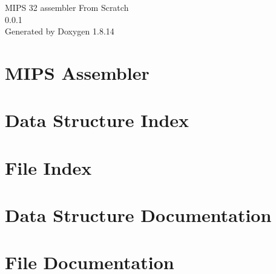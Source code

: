 \documentclass[twoside]{book}
\newcommand{\+}{\discretionary{\mbox{\scriptsize$\hookleftarrow$}}{}{}}
\newcommand{\clearemptydoublepage}{%
  \newpage{\pagestyle{empty}\cleardoublepage}%
}
\begin{document}
\hypersetup{pageanchor=false,
             bookmarksnumbered=true,
             pdfencoding=unicode
            }
\begin{titlepage}
\vspace*{7cm}
\begin{center}%
{\Large M\+I\+PS 32 assembler From Scratch \\[1ex]\large 0.\+0.\+1 }\\
\vspace*{1cm}
{\large Generated by Doxygen 1.8.14}\\
\end{center}
\end{titlepage}
\clearemptydoublepage
{}
\tableofcontents
\clearemptydoublepage
{}
\hypersetup{pageanchor=true}

\chapter{M\+I\+PS Assembler}
\label{index}\hypertarget{index}{}
\chapter{Data Structure Index}

\chapter{File Index}

\chapter{Data Structure Documentation}














\chapter{File Documentation}































\backmatter
\newpage
{}
\clearemptydoublepage
{}
\printindex
\end{document}
